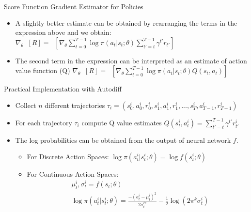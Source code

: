 \begin{frame}{Score Function Gradient Estimator for Policies}
    \begin{itemize}
        \item A slightly better estimate can be obtained by rearranging the terms in the expression above and we obtain:
        $\nabla_\theta \mathop{\mathbb{E}_\tau}[R] = \mathop{\mathbb{E}_\tau}[ \nabla_\theta \sum_{t=0}^{T-1}\log\pi(a_t|s_t;\theta)\sum_{t' = t}^{T-1} \gamma^{t'} r_{t'}]$
        \item The second term in the expression can be interpreted as an estimate of action value function (Q)
        $\nabla_\theta \mathop{\mathbb{E}_\tau}[R] = \mathop{\mathbb{E}_\tau}[\nabla_\theta \sum_{t=0}^{T-1}\log\pi(a_t|s_t;\theta)Q(s_t,a_t)]$
    \end{itemize}
\end{frame}
\begin{frame}{Practical Implementation with Autodiff}
\begin{itemize}
    \item Collect $n$ different trajectories $\tau_i = (s_0^i,a_0^i,r_0^i,s_1^i,a_1^i,r_1^i,...,s_T^i, a_{T-1}^i, r_{T-1}^i)$
    \item For each trajectory $\tau_i$ compute Q value estimates
    $Q(s_t^i, a_t^i) = \sum_{t' = t}^{T-1}\gamma^{t'}r_{t'}^i$
    \item The log probabilities can be obtained from the output of neural network $f$.
    \begin{itemize}
        \item For Discrete Action Spaces:
        $\log\pi(a_t^i|s_t^i;\theta) = \log f(s_t^i;\theta)$
        \item For Continuous Action Spaces:
        \begin{equation*}
            \begin{split}
               &\mu_t^i, \sigma_t^i = f(s_t;\theta)\\
                &\log\pi(a_t^i|s_t^i;\theta) = \frac{-(a_t^i-\mu_t^i)^2}{2\sigma_t^{i2}} - \frac{1}{2}\log(2\pi^k\sigma_t^i)
            \end{split}
        \end{equation*}
    \end{itemize}
\end{itemize}

\end{frame}
